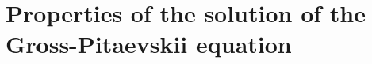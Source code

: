 \documentclass[11pt,a4paper]{article}
\newcommand{\cU}{{\cal U}}
\newcommand{\tr}{\mbox{Tr}}
\newcommand{\cH}{{\cal H}}
\newcommand{\cN}{{\cal N}}
\begin{document}




\appendix


\section{Properties of the solution of the Gross-Pitaevskii equation}
\label{s:pde}
\end{document}
